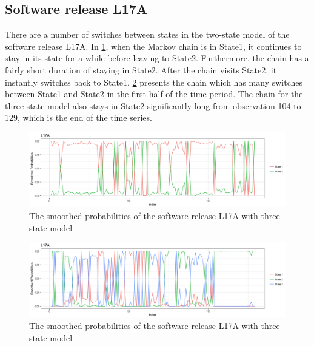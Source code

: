 \subsection{Software release L17A}

There are a number of switches between states in the two-state model
of the software release L17A. In \ref{L17A_2_smo}, when the Markov
chain is in State1, it continues to stay in its state for a while
before leaving to State2. Furthermore, the chain has a fairly short
duration of staying in State2. After the chain visits State2, it instantly
switches back to State1. \ref{L17A_3_smo} presents the chain which
has many switches between State1 and State2 in the first half of the
time period. The chain for the three-state model also stays in State2
significantly long from observation 104 to 129, which is the end of
the time series.

\begin{figure}[H]
\centering{}\includegraphics[scale=0.35]{picture/L17A_2_smo1}\caption{The smoothed probabilities of the software release L17A with three-state
model}
\label{L17A_2_smo}
\end{figure}
\begin{figure}[H]
\begin{centering}
\includegraphics[scale=0.35]{picture/L17A_3_smo1}\caption{The smoothed probabilities of the software release L17A with three-state
model}
\label{L17A_3_smo}
\par\end{centering}
\end{figure}

